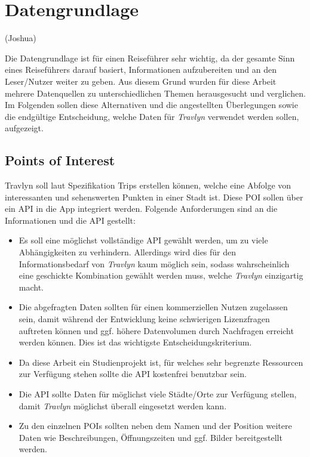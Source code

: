 \chapter{Datengrundlage}\label{sec:datengrundlage}
(Joshua)

Die Datengrundlage ist für einen Reiseführer sehr wichtig, da der gesamte Sinn eines Reiseführers darauf basiert, Informationen aufzubereiten und an den Leser/Nutzer weiter zu geben. Aus diesem Grund wurden für diese Arbeit mehrere Datenquellen zu unterschiedlichen Themen herausgesucht und verglichen. Im Folgenden sollen diese Alternativen und die angestellten Überlegungen sowie die endgültige Entscheidung, welche Daten für \textit{Travlyn} verwendet werden sollen, aufgezeigt.

\section{Points of Interest}
Travlyn soll laut Spezifikation Trips erstellen können, welche eine Abfolge von interessanten und sehenswerten Punkten in einer Stadt ist. Diese \ac{POI} sollen über ein \ac{API} in die App integriert werden. Folgende Anforderungen sind an die Informationen und die API gestellt:

\begin{itemize}
	\item Es soll eine möglichst vollständige \acs{API} gewählt werden, um zu viele Abhängigkeiten zu verhindern. Allerdings wird dies für den Informationsbedarf von \textit{Travlyn} kaum möglich sein, sodass wahrscheinlich eine geschickte Kombination gewählt werden muss, welche \textit{Travlyn} einzigartig macht.
	\item Die abgefragten Daten sollten für einen kommerziellen Nutzen zugelassen sein, damit während der Entwicklung keine schwierigen Lizenzfragen auftreten können und ggf. höhere Datenvolumen durch Nachfragen erreicht werden können. Dies ist das wichtigste Entscheidungskriterium.
	\item Da diese Arbeit ein Studienprojekt ist, für welches sehr begrenzte Ressourcen zur Verfügung stehen sollte die API kostenfrei benutzbar sein.  
	\item Die API sollte Daten für möglichst viele Städte/Orte zur Verfügung stellen, damit \textit{Travlyn} möglichst überall eingesetzt werden kann.
	\item Zu den einzelnen POIs sollten neben dem Namen und der Position weitere Daten wie Beschreibungen, Öffnungszeiten und ggf. Bilder bereitgestellt werden.
\end{itemize}

